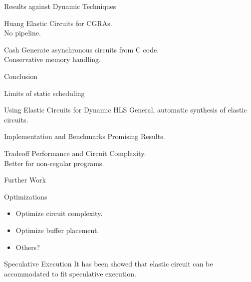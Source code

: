 \documentclass[page number]{beamer}
\begin{document}
\begin{frame}{Results against Dynamic Techniques}
  \begin{block}{Huang}
    Elastic Circuits for CGRAs.\\
    No pipeline.
  \end{block}
  \vfill
  \begin{block}{Cash}
    Generate asynchronous circuits from C code.\\
    Conservative memory handling.
  \end{block}
  \vfill
  \tiny
  \hspace*{-8pt}
\end{frame}

\begin{frame}{Conclusion}
  \begin{alertblock}{Limits of static scheduling}
  \end{alertblock}
  \vfill
  \begin{exampleblock}{Using Elastic Circuits for Dynamic HLS}
    General, automatic synthesis of elastic circuits.
  \end{exampleblock}
  \vfill
  \begin{exampleblock}{Implementation and Benchmarks}
    Promising Results.
  \end{exampleblock}
  \vfill
  \begin{block}{Tradeoff}
    Performance and Circuit Complexity.\\
    Better for non-regular programs.
  \end{block}
\end{frame}

\begin{frame}{Further Work}
  \begin{block}{Optimizations}
    \begin{itemize}
    \item Optimize circuit complexity.
    \item Optimize buffer placement.
    \item Others?
    \end{itemize}
  \end{block}
  \vfill
  \begin{block}{Speculative Execution}
    It has been showed that elastic circuit can be accommodated to fit speculative execution.
  \end{block}
\end{frame}
\end{document}
